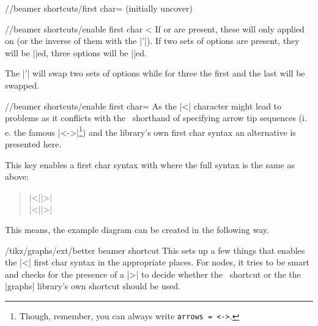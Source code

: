 \begin{key}{/\tikzext/beamer shortcuts/first char=%
   (initially uncover)}
\begin{key}{/\tikzext/beamer shortcuts/enable first char <}
  If  or  are present,
  these will only applied on  (or the inverse of them with the |'|).
  If two sets of options are present, they will be |\alt|ed, three options will be |\temporal|ed.
  
  The |'| will swap two sets of options while for three the first and the last will be swapped.
\end{key}
\begin{key}{/\tikzext/beamer shortcuts/enable first char=}
  As the |<| character might lead to problems as it conflicts with the \tikzname\ shorthand
  of specifying arrow tip sequences
  (i.\,e. the famous |<->|\footnote{Though, remember, you can always write \texttt{arrows = <->}.})
  and the  library's own first char syntax
  an alternative is presented here.
  
  This key enables a first char syntax with  where the full syntax is the same as above:
  \begin{quote}
      |<||>|\\
      |<||>|
  \end{quote}
  
  This means, the example diagram can be created in the following way.
\begin{codeexample}[preamble=\usetikzlibrary{ext.beamer} \setbeamercovered{transparent},code only]
\end{codeexample}
\end{key}
\begin{key}{/{tikz/graphs/ext}/better beamer shortcut}
This sets up a few things that enables the |<| first char syntax in the appropriate places.
For nodes, it tries to be smart and checks for the presence of a |>| to decide whether the \Beamer\ shortcut
or the the |graphs| library's own shortcut should be used.
\end{key}
\end{key}


